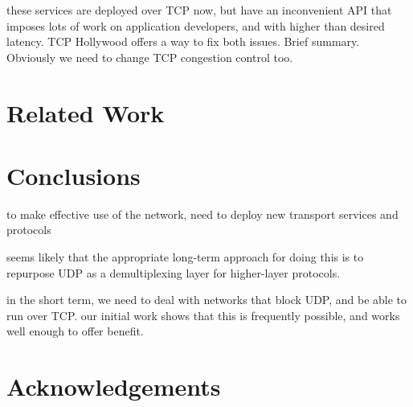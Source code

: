 \documentclass{sig-alternate-05-2015}
\begin{document}
these services are deployed over TCP now, but have an inconvenient API that
imposes lots of work on application developers, and with higher than desired
latency. 
TCP Hollywood offers a way to fix both issues.
Brief summary.
Obviously we need to change TCP congestion control too.

\section{Related Work}
\label{sec:related}

%
% 



\section{Conclusions}
\label{sec:conclusions}

to make effective use of the network, need to deploy new transport services
and protocols

seems likely that the appropriate long-term approach for doing this is to
repurpose UDP as a demultiplexing layer for higher-layer protocols. 

in the short term, we need to deal with networks that block UDP, and be
able to run over TCP.
our initial work shows that this is frequently possible, and works well
enough to offer benefit.

\section{Acknowledgements}




\end{document}
